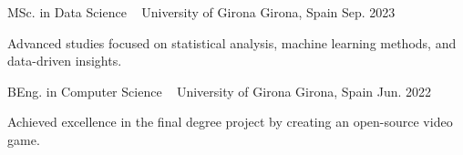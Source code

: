 

\begin{cventries}

  \cventry
    {MSc. in Data Science \ \href{https://1drv.ms/b/s!AkpkVWgTjVvhg75Ia949k6hMR4yAdQ?e=RifsPu}{{\scriptsize \faExternalLink}}} %
    {University of Girona} %
    {Girona, Spain} %
    {Sep. 2023} %
    {
      \begin{cvitems} %
      \item {Advanced studies focused on statistical analysis, machine learning methods, and data-driven insights.}
      \end{cvitems}
    }

    \cventry
    {BEng. in Computer Science \ \href{https://1drv.ms/b/s!AkpkVWgTjVvhg74LnMHf7OWtWJlmrg?e=gcWA80}{{\scriptsize \faExternalLink}}} %
    {University of Girona} %
    {Girona, Spain} %
    {Jun. 2022} %
    {
      \begin{cvitems} %
        \item {Achieved excellence in the final degree project by creating an open-source video game.}
      \end{cvitems}
    }

\end{cventries}

